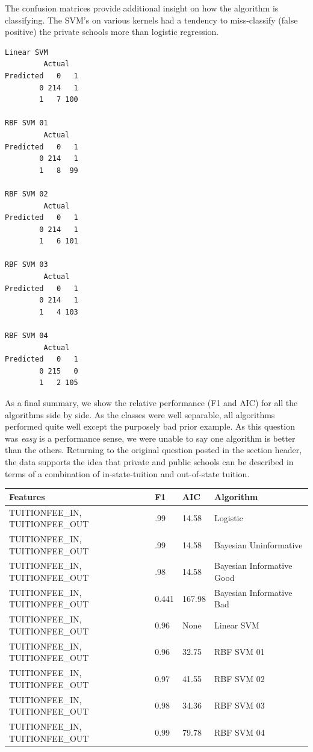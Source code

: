 \documentclass[10pt]{article}
\begin{document}
The confusion matrices provide additional insight on how the algorithm is classifying. The SVM's on various kernels had a tendency to miss-classify (false positive) the private schools more than logistic regression.

\begin{lstlisting}
Linear SVM  
         Actual
Predicted   0   1
        0 214   1
        1   7 100

RBF SVM 01  
         Actual
Predicted   0   1
        0 214   1
        1   8  99
  
RBF SVM 02 
         Actual
Predicted   0   1
        0 214   1
        1   6 101
   
RBF SVM 03 
         Actual
Predicted   0   1
        0 214   1
        1   4 103

RBF SVM 04
         Actual
Predicted   0   1
        0 215   0
        1   2 105
\end{lstlisting}

As a final summary, we show the relative performance (F1 and AIC) for all the algorithms side by side. As the classes were well separable, all algorithms performed quite well except the purposely bad prior example. As this question was \textit{easy} is a performance sense, we were unable to say one algorithm is better than the others. Returning to the original question posted in the section header, the data supports the idea that private and public schools can be described in terms of a combination of in-state-tuition and out-of-state tuition.

\begin{center}
\begin{tabular}{ |P{4cm}|P{2cm}|P{2cm}|P{2cm}| }
 \hline Features & F1 & AIC & Algorithm \\ \hline
 TUITIONFEE\_IN, TUITIONFEE\_OUT  & .99 & 14.58 & Logistic \\ \hline 
 TUITIONFEE\_IN, TUITIONFEE\_OUT & .99 & 14.58 & Bayesian Uninformative \\ \hline 
 TUITIONFEE\_IN, TUITIONFEE\_OUT & .98 & 14.58 & Bayesian Informative Good \\ \hline 
 TUITIONFEE\_IN, TUITIONFEE\_OUT & 0.441 & 167.98 & Bayesian Informative Bad \\ \hline 
 TUITIONFEE\_IN, TUITIONFEE\_OUT & 0.96 & None & Linear SVM \\ \hline 
 TUITIONFEE\_IN, TUITIONFEE\_OUT & 0.96 & 32.75 & RBF SVM 01 \\ \hline 
 TUITIONFEE\_IN, TUITIONFEE\_OUT & 0.97 & 41.55 & RBF SVM 02 \\ \hline 
 TUITIONFEE\_IN, TUITIONFEE\_OUT & 0.98 & 34.36 & RBF SVM 03 \\ \hline 
 TUITIONFEE\_IN, TUITIONFEE\_OUT & 0.99 & 79.78 & RBF SVM 04 \\ \hline 
\end{tabular}
\end{center}
\end{document}

